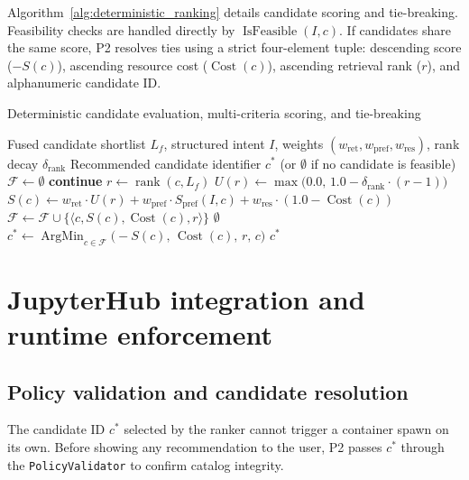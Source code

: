 Algorithm~\ref{alg:deterministic_ranking} details candidate scoring and tie-breaking. Feasibility checks are handled directly by $\operatorname{IsFeasible}(I, c)$. If candidates share the same score, P2 resolves ties using a strict four-element tuple: descending score ($-S(c)$), ascending resource cost ($\operatorname{Cost}(c)$), ascending retrieval rank ($r$), and alphanumeric candidate ID.

\begin{algorithm}[ht]{Deterministic candidate evaluation, multi-criteria scoring, and tie-breaking}
\label{alg:deterministic_ranking}
\begin{algorithmic}[1]
\Require Fused candidate shortlist $L_f$, structured intent $I$, weights $(w_{\mathrm{ret}}, w_{\mathrm{pref}}, w_{\mathrm{res}})$, rank decay $\delta_{\mathrm{rank}}$
\Ensure Recommended candidate identifier $c^*$ (or $\emptyset$ if no candidate is feasible)
\State $\mathcal{F} \gets \emptyset$
        \State \textbf{continue} 
    \EndIf
    \State $r \gets \operatorname{rank}(c, L_f)$
    \State $U(r) \gets \max\big(0.0, \, 1.0 - \delta_{\mathrm{rank}} \cdot (r - 1)\big)$
    \State $S(c) \gets w_{\mathrm{ret}} \cdot U(r) + w_{\mathrm{pref}} \cdot S_{\mathrm{pref}}(I, c) + w_{\mathrm{res}} \cdot (1.0 - \operatorname{Cost}(c))$
    \State $\mathcal{F} \gets \mathcal{F} \cup \{\langle c, S(c), \operatorname{Cost}(c), r \rangle\}$
\EndFor
{}
    \State \Return $\emptyset$ 
\EndIf
\State $c^* \gets \operatorname{ArgMin}_{c \in \mathcal{F}} \big(-S(c), \, \operatorname{Cost}(c), \, r, \, c\big)$ 
\State \Return $c^*$
\end{algorithmic}
\end{algorithm}

\section{JupyterHub integration and runtime enforcement}

\subsection{Policy validation and candidate resolution}
\label{subsec:policy_validation}

The candidate ID $c^*$ selected by the ranker cannot trigger a container spawn on its own. Before showing any recommendation to the user, P2 passes $c^*$ through the \texttt{PolicyValidator} to confirm catalog integrity.

